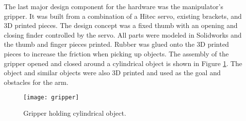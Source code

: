 The last major design component for the hardware was the manipulator's gripper. It was built from a combination of a Hitec servo, existing brackets, and 3D printed pieces. The design concept was a fixed thumb with an opening and closing finder controlled by the servo. All parts were modeled in Solidworks and the thumb and finger pieces printed. Rubber was glued onto the 3D printed pieces to increase the friction when picking up objects. The assembly of the gripper opened and closed around a cylindrical object is shown in Figure \ref{fig:gripper}. The object and similar objects were also 3D printed and used as the goal and obstacles for the arm.

\begin{figure}[h]
\centering
\texttt{[image: gripper]}
\caption{Gripper holding cylindrical object.}
\label{fig:gripper}
\end{figure}
